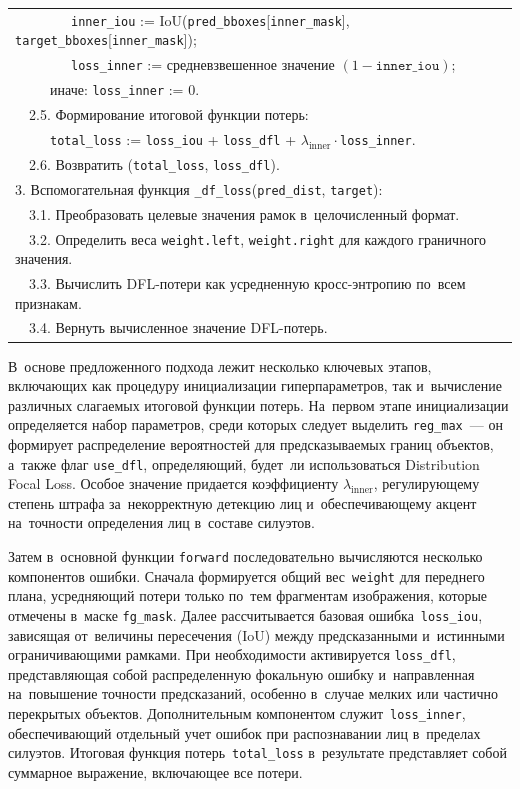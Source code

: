 \begin{longtable}{@{}p{}@{}}
~~~~~~~~\texttt{inner\_iou} := IoU(\texttt{pred\_bboxes}[\texttt{inner\_mask}], \texttt{target\_bboxes}[\texttt{inner\_mask}]);\\
~~~~~~~~\texttt{loss\_inner} := средневзвешенное значение $(1-\texttt{inner\_iou})$;\\
~~~~~иначе: \texttt{loss\_inner} := 0.\\
~~2.5. Формирование итоговой функции потерь:\\
~~~~~\texttt{total\_loss} := \texttt{loss\_iou} + \texttt{loss\_dfl} + $\lambda_{\text{inner}}\cdot$\texttt{loss\_inner}.\\
~~2.6. Возвратить (\texttt{total\_loss}, \texttt{loss\_dfl}).\\
3. Вспомогательная функция \texttt{\_df\_loss}(\texttt{pred\_dist}, \texttt{target}):\\
~~3.1. Преобразовать целевые значения рамок в~целочисленный формат.\\
~~3.2. Определить веса \texttt{weight.left}, \texttt{weight.right} для каждого граничного значения.\\
~~3.3. Вычислить DFL-потери как усредненную кросс-энтропию по~всем признакам.\\
~~3.4. Вернуть вычисленное значение DFL-потерь.\\
\end{longtable}

В~основе предложенного подхода лежит несколько ключевых этапов,
включающих как процедуру инициализации гиперпараметров, так
и~вычисление различных слагаемых итоговой функции потерь. На~первом
этапе инициализации определяется набор параметров, среди которых
следует выделить \texttt{reg\_max}~--- он формирует распределение
вероятностей для предсказываемых границ объектов, а~также флаг
\texttt{use\_dfl}, определяющий, будет~ли использоваться Distribution
Focal Loss. Особое значение придается коэффициенту
$\lambda_{\text{inner}}$, регулирующему степень штрафа за~некорректную
детекцию лиц и~обеспечивающему акцент на~точности определения лиц
в~составе силуэтов.

Затем в~основной функции \texttt{forward} последовательно вычисляются
несколько компонентов ошибки. Сначала формируется общий
вес~\texttt{weight} для переднего плана, усредняющий потери только
по~тем фрагментам изображения, которые отмечены в~маске
\texttt{fg\_mask}. Далее рассчитывается базовая
ошибка~\texttt{loss\_iou}, зависящая от~величины пересечения (IoU)
между предсказанными и~истинными ограничивающими рамками. При
необходимости активируется \texttt{loss\_dfl}, представляющая собой
распределенную фокальную ошибку и~направленная на~повышение точности
предсказаний, особенно в~случае мелких или частично перекрытых
объектов. Дополнительным компонентом служит~\texttt{loss\_inner},
обеспечивающий отдельный учет ошибок при распознавании лиц в~пределах
силуэтов. Итоговая функция потерь~\texttt{total\_loss} в~результате
представляет собой суммарное выражение, включающее все потери.

